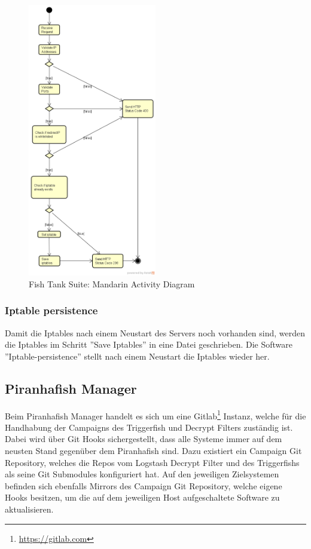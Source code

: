 \begin{figure}[H]
	\centering
	\includegraphics[width=0.5\textwidth]{img/MandarinActivityDiagram.png}
	\caption{Fish Tank Suite: Mandarin Activity Diagram}
	\label{fig:Fish_Tank_Suite_Mandarin_Activity_Diagram}
\end{figure}

\subsubsection{Iptable persistence}
Damit die Iptables nach einem Neustart des Servers noch vorhanden sind, werden die Iptables im Schritt ''Save Iptables'' in eine Datei geschrieben. Die Software ''Iptable-persistence'' stellt nach einem Neustart die Iptables wieder her.


\subsection{Piranhafish Manager}
Beim Piranhafish Manager handelt es sich um eine Gitlab\footnote{\url{https://gitlab.com}} Instanz, welche für die Handhabung der Campaigns des Triggerfish und Decrypt Filters zuständig ist.
Dabei wird über Git Hooks sichergestellt, dass alle Systeme immer auf dem neusten Stand gegenüber dem Piranhafish sind. Dazu existiert ein Campaign Git Repository, welches die Repos vom Logstash Decrypt Filter und des Triggerfishs als seine Git Submodules konfiguriert hat.
Auf den jeweiligen Zielsystemen befinden sich ebenfalls Mirrors des Campaign Git Repository, welche eigene Hooks besitzen, um die auf dem jeweiligen Host aufgeschaltete Software zu aktualisieren.

